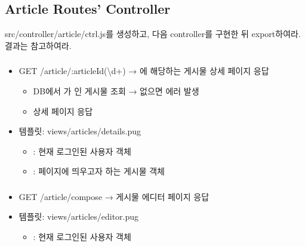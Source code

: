 \subsection*{Article Routes' Controller}

src/controller/article/ctrl.js를 생성하고, 다음 controller를 구현한 뒤 export하여라. 결과는 \를 참고하여라.

\subsubsection*{}
\begin{itemize}
    \item GET /article/:articleId(\textbackslash{}d+) → 에 해당하는 게시물 상세 페이지 응답
    \begin{itemize}
        \item DB에서 가 인 게시물 조회 → 없으면  에러 발생
        \item 상세 페이지 응답
    \end{itemize}
    \item 템플릿: views/articles/details.pug
    \begin{itemize}
        \item {}: 현재 로그인된 사용자 객체
        \item {}: 페이지에 띄우고자 하는 게시물 객체
    \end{itemize}
\end{itemize}

\subsubsection*{}
\begin{itemize}
    \item GET /article/compose → 게시물 에디터 페이지 응답
    \item 템플릿: views/articles/editor.pug
    \begin{itemize}
        \item {}: 현재 로그인된 사용자 객체
    \end{itemize}
\end{itemize}

